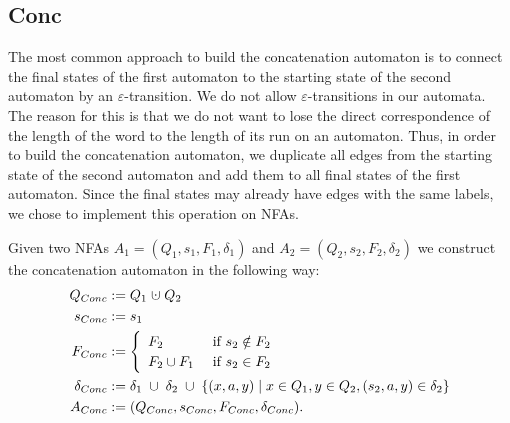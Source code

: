 \subsection{Conc}
The most common approach to build the concatenation automaton is to connect
the final states of the first automaton to the starting state of the second automaton
by an $\varepsilon$-transition. 
We do not allow $\varepsilon$-transitions in our automata. 
The reason for this is that we do not want to lose the direct correspondence 
of the length of the word to the length of its run on an automaton.
Thus, in order to build the concatenation automaton, we duplicate all edges from
the starting state of the second automaton and add them to all final states 
of the first automaton.
Since the final states may already have edges with the same labels, 
we chose to implement this operation on NFAs.

\begin{definition}
   Given two NFAs
    $A_1=(Q_1, s_1, F_1, \delta_1)$ and $A_2=(Q_2, s_2, F_2, \delta_2)$ 
    we construct the concatenation automaton in the following way:
    \begin{align*}
        Q_{Conc} &:= Q_1 \; \dotcup \; Q_2 \\
        s_{Conc} &:= s_1 \\
        F_{Conc} &:= 
            \begin{cases}
                \begin{array}{ll}
                    F_2 & \mbox{ if } s_2 \notin F_2 \\
                    F_2 \cup F_1 & \mbox{ if } s_2 \in F_2
                \end{array}
            \end{cases}
        \\ %
        \delta_{Conc} &:= \delta_1 \; \cup \; \delta_2 \; \cup \; 
                         \{(x, a, y) \; | \; x \in Q_1, y \in Q_2, (s_2, a, y) \in \delta_2 \} \\
        A_{Conc} &:= (Q_{Conc}, s_{Conc}, F_{Conc}, \delta_{Conc}).
    \end{align*}
\end{definition}

